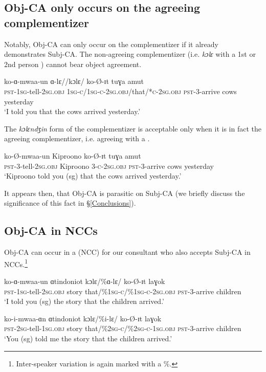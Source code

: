 \documentclass[output=paper,newtxmath,modfonts,nonflat,hidelinks]{langsci/langscibook}
\begin{document}
\subsection{Obj-CA only occurs on the agreeing complementizer} \label{Obj-CA Parasitic}

\noindent Notably,  Obj-CA can only occur on the complementizer if it already demonstrates Subj-CA. The non-agreeing complementizer (i.e. \textit{kɔlɛ} with a 1st or 2nd person ) cannot bear object agreement. 

\ea
\gll ko-ɑ-mwaa-un ɑ-lɛ//kɔlɛ/ ko-\O-ɪt tuɣa amut \\
\textsc{pst}-1\textsc{sg}-tell-2\textsc{sg}.\textsc{obj} 1\textsc{sg-c/}1\textsc{sg-c-}2\textsc{sg}.\textsc{obj}/that/*\textsc{c}-2\textsc{sg}.\textsc{obj} \textsc{pst}-3-arrive cows yesterday \\
\glt `I told you that the cows arrived yesterday.'
\z

\noindent The \textit{kɔlɛndʒin} form of the complementizer is acceptable only when it is in fact the agreeing complementizer, i.e. agreeing with a  .

\ea
\gll ko-\O-mwaa-un Kiproono  ko-\O-ɪt tuɣa amut \\
\textsc{pst}-3-tell-2\textsc{sg}.\textsc{obj} Kiproono 3-\textsc{c}-2\textsc{sg}.\textsc{obj} \textsc{pst}-3-arrive cows yesterday \\
\glt `Kiproono told you (sg) that the cows arrived yesterday.'
\z

\noindent It appears then, that Obj-CA is parasitic on Subj-CA (we briefly discuss the significance of this fact in \S \ref{Conclusions}). 

\subsection{Obj-CA in NCCs}

Obj-CA can occur in a  (NCC) for our consultant who also accepts Subj-CA in NCCs.\footnote{Inter-speaker variation is again marked with a \%.}

\ea
\begin{xlist}

\ex
\gll ko-ɑ-mwaa-un ɑtindoniot kɔlɛ/\%ɑ-lɛ/ ko-\O-ɪt laɣok \\
\textsc{pst}-1\textsc{sg}-tell-2\textsc{sg}.\textsc{obj} story that/\%1\textsc{sg-c/\%}1\textsc{sg-c-}2\textsc{sg}.\textsc{obj} \textsc{pst}-3-arrive children \\
\glt `I told you (sg) the story that the children arrived.'

\ex
\gll ko-i-mwaa-ɑn ɑtindoniot kɔlɛ/\%i-lɛ/ ko-\O-ɪt laɣok \\
\textsc{pst}-2\textsc{sg}-tell-1\textsc{sg}.\textsc{obj} story that/\%2\textsc{sg-c/\%}2\textsc{sg-c-}1\textsc{sg}.\textsc{obj} \textsc{pst}-3-arrive children \\
\glt `You (sg) told me the story that the children arrived.'

\end{xlist}
\z
\end{document}
